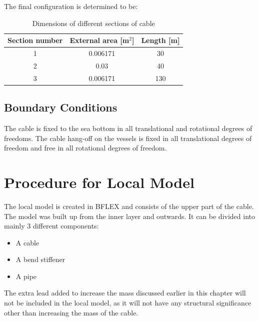 \noindent The final configuration is determined to be: 
\begin{table} [H]
\centering
\begin{tabular}{ |c|c|c|}
\hline
Section number & External area [m$^2$] & Length [m] \\
 \hline
 \hline
1 & 0.006171 & 30\\
2 & 0.03 & 40\\
3 & 0.006171 & 130\\
 \hline
\end{tabular}
\caption{Dimensions of different sections of cable}
\label{table:DIMCABLE}
\end{table}

\subsection{Boundary Conditions}
The cable is fixed to the sea bottom in all translational and rotational degrees of freedoms. The cable hang-off on the vessels is fixed in all translational degrees of freedom and free in all rotational degrees of freedom. 

\section{Procedure for Local Model}
The local model is created in BFLEX and consists of the upper part of the cable. The model was built up from the inner layer and outwards. It can be divided into mainly 3 different components:
\begin{itemize}
    \item A cable
    \item A bend stiffener
    \item A pipe
\end{itemize}

\noindent The extra lead added to increase the mass discussed earlier in this chapter will not be included in the local model, as it will not have any structural significance other than increasing the mass of the cable.\newline
\newline
